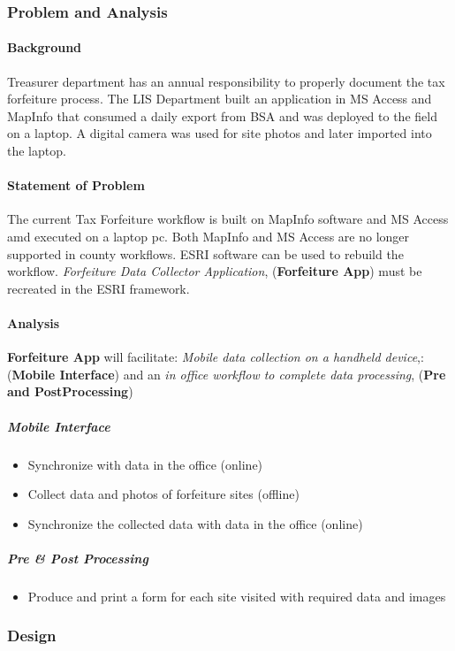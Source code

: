 \documentclass[class=book , crop=false, titlepage, twoside, multi={itemize, figure, verbatim}, float=false]{standalone}
\begin{document}
\subsubsection{Problem and Analysis}
%
\begin{multicols}{2}
\paragraph{Background}
%
\noindent Treasurer department has an annual responsibility to properly document the tax forfeiture process.  The LIS Department built an application in MS Access and MapInfo that consumed a daily export from BSA and was deployed to the field on a laptop.  A digital camera was used for site photos and later imported into the laptop.
%
\paragraph{Statement of Problem}
%
\noindent The current Tax Forfeiture workflow is built on MapInfo software and MS Access amd executed on a laptop pc.  Both MapInfo and MS Access are no longer supported in county workflows.  ESRI software can be used to rebuild the workflow.  \textit{Forfeiture Data Collector Application}, (\textbf{Forfeiture App}) must be recreated in the ESRI framework.
%
\paragraph{Analysis}
%
\noindent \textbf{Forfeiture App} will facilitate: \textit{Mobile data collection on a handheld device},: (\textbf{Mobile Interface}) and an \textit{in office workflow to complete data processing}, (\textbf{Pre and PostProcessing})
%
\subparagraph*{Mobile Interface}
%
\begin{itemize} %
%
\item Synchronize with data in the office (online)
%
\item Collect data and photos of forfeiture sites (offline)
%
\item Synchronize the collected data with data in the office (online)
%
\end{itemize} %
%
\subparagraph*{Pre \& Post Processing}
%
\begin{itemize} %
%
\item Produce and print a form for each site visited with required data and images
%
\end{itemize} %
%
\end{multicols}
%
\clearpage
\subsubsection{Design}
\end{document}
